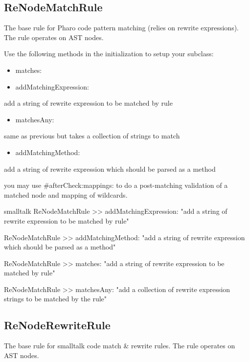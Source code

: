 \documentclass[10pt,twoside,english]{_support/latex/sbabook/sbabook}
\begin{document}
\subsection{ReNodeMatchRule}
The base rule for Pharo code pattern matching (relies on rewrite expressions). The rule operates on AST nodes.

Use the following methods in the initialization to setup your subclass:

\begin{itemize}
    \item matches:
    \item addMatchingExpression:
\end{itemize}

add a string of rewrite expression to be matched by rule

\begin{itemize}
    \item matchesAny:
\end{itemize}

same as previous but takes a collection of strings to match



\begin{itemize}
    \item addMatchingMethod:
\end{itemize}

add a string of rewrite expression which should be parsed as a method


you may use \#afterCheck:mappings: to do a post-matching validation of a matched node and mapping of wildcards.
\begin{displaycode}{smalltalk}
ReNodeMatchRule >> addMatchingExpression:
	"add a string of rewrite expression to be matched by rule"

ReNodeMatchRule >> addMatchingMethod:
"add a string of rewrite expression which should be parsed as a method"

ReNodeMatchRule >> matches:
"add a string of rewrite expression to be matched by rule"

ReNodeMatchRule >> matchesAny:
"add a collection of rewrite expression strings to be matched by the rule"
\end{displaycode}

\subsection{ReNodeRewriteRule}
The base rule for smalltalk code match \& rewrite rules. The rule operates on AST nodes.
\end{document}
